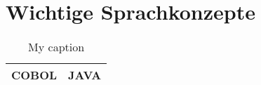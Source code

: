 \section{Wichtige Sprachkonzepte}

\begin{table}[]
\centering
\caption{My caption}
\label{my-label}
\begin{tabular}{|c|c|}
COBOL & JAVA \\
\hline
\end{tabular}
\end{table}